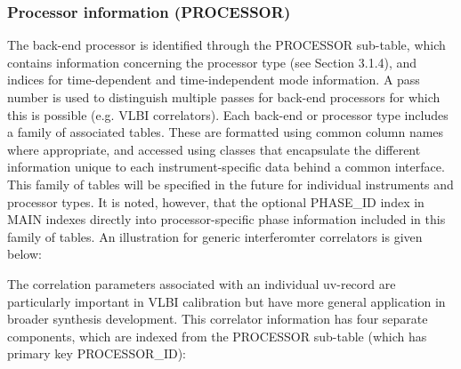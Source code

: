 \documentclass{article}
\begin{document}
\subsubsection{Processor information (PROCESSOR)}

The back-end processor is identified through the PROCESSOR sub-table,
which contains information concerning the processor type (see Section
3.1.4), and indices for time-dependent and time-independent mode
information. A pass number is used to distinguish multiple passes for
back-end processors for which this is possible (e.g. VLBI
correlators). Each back-end or processor type includes a family of
associated tables. These are formatted using common column names where
appropriate, and accessed using classes that encapsulate the different
information unique to each instrument-specific data behind a common
interface. This family of tables will be specified in the future for
individual instruments and processor types. It is noted, however, that
the optional PHASE\_ID index in MAIN indexes directly into
processor-specific phase information included in this family of
tables. An illustration for generic interferomter correlators is given
below:

The correlation parameters associated with an individual uv-record are
particularly important in VLBI calibration but have more general
application in broader synthesis development. This correlator
information has four separate components, which are indexed from the
PROCESSOR sub-table (which has primary key PROCESSOR\_ID):
\end{document}
